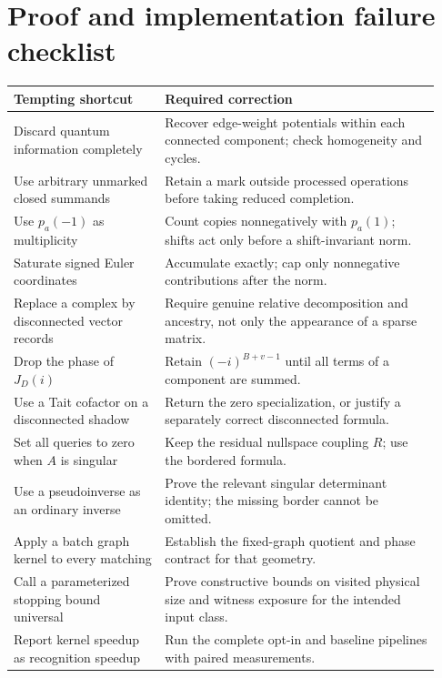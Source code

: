 \documentclass[11pt]{article}
\theoremstyle{definition}
\theoremstyle{remark}
\begin{document}
\section{Proof and implementation failure checklist}
\label{app:checklist}
\begin{longtable}{p{0.33\linewidth}p{0.60\linewidth}}
\toprule
Tempting shortcut & Required correction\\
\midrule
\endhead
Discard quantum information completely & Recover edge-weight potentials within each connected component; check homogeneity and cycles.\\[3pt]
Use arbitrary unmarked closed summands & Retain a mark outside processed operations before taking reduced completion.\\[3pt]
Use $p_a(-1)$ as multiplicity & Count copies nonnegatively with $p_a(1)$; shifts act only before a shift-invariant norm.\\[3pt]
Saturate signed Euler coordinates & Accumulate exactly; cap only nonnegative contributions after the norm.\\[3pt]
Replace a complex by disconnected vector records & Require genuine relative decomposition and ancestry, not only the appearance of a sparse matrix.\\[3pt]
Drop the phase of $J_D(i)$ & Retain $(-i)^{B+v-1}$ until all terms of a component are summed.\\[3pt]
Use a Tait cofactor on a disconnected shadow & Return the zero specialization, or justify a separately correct disconnected formula.\\[3pt]
Set all queries to zero when $A$ is singular & Keep the residual nullspace coupling $R$; use the bordered formula.\\[3pt]
Use a pseudoinverse as an ordinary inverse & Prove the relevant singular determinant identity; the missing border cannot be omitted.\\[3pt]
Apply a batch graph kernel to every matching & Establish the fixed-graph quotient and phase contract for that geometry.\\[3pt]
Call a parameterized stopping bound universal & Prove constructive bounds on visited physical size and witness exposure for the intended input class.\\[3pt]
Report kernel speedup as recognition speedup & Run the complete opt-in and baseline pipelines with paired measurements.\\
\bottomrule
\end{longtable}
\end{document}
